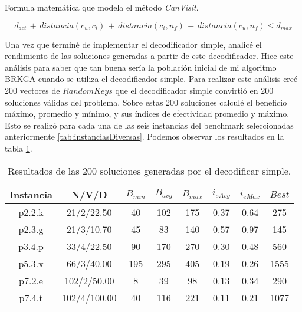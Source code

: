 \bigskip

\begin{mycapequ}[!ht]
	\caption{Formula matemática que modela el método \textit{CanVisit}.}
	\begin{equation} \label{eq:canVisit}
	d_{act}\, +\, distancia(c_u, c_i)\, +\, distancia(c_i, n_f)\, -\, distancia(c_u, n_f) \leq d_{max}
	\end{equation}
\end{mycapequ}

\bigskip

Una vez que terminé de implementar el decodificador simple, analicé el rendimiento de las soluciones generadas a partir de este decodificador. Hice este análisis para saber que tan buena sería la población inicial de mi algoritmo BRKGA cuando se utiliza el decodificador simple. Para realizar este análisis creé 200 vectores de $RandomKeys$ que el decodificador simple convirtió en 200 soluciones válidas del problema. Sobre estas 200 soluciones calculé el beneficio máximo, promedio y mínimo, y sus índices de efectividad promedio y máximo. Esto se realizó para cada una de las seis instancias del benchmark seleccionadas anteriormente \ref{tab:instanciasDiversas}. Podemos observar los resultados en la tabla \ref{tab:resultadosDecoSimple}.

\bigskip

\begin{table}
\begin{center}
\begin{tabular}{ |c|c|c|c|c|c|c|c| } 
\hline
Instancia & N/V/D & $B_{min}$ & $B_{avg}$ & $B_{max}$ & $i_{eAvg}$ & $i_{eMax}$ & $Best$ \\
\hline
p2.2.k & 21/2/22.50 & 40 & 102 & 175 & 0.37 & 0.64 & 275 \\
p2.3.g & 21/3/10.70 & 45 & 83 & 140 & 0.57 & 0.97 & 145 \\
p3.4.p & 33/4/22.50 & 90 & 170 & 270 & 0.30 & 0.48 & 560 \\
p5.3.x & 66/3/40.00 & 195 & 295 & 405 & 0.19 & 0.26 & 1555 \\
p7.2.e & 102/2/50.00 & 8 & 39 & 98 & 0.13 & 0.34 & 290 \\
p7.4.t & 102/4/100.00 & 40 & 116 & 221 & 0.11 & 0.21 & 1077 \\
\hline
\end{tabular}
\end{center}
\caption{Resultados de las 200 soluciones generadas por el decodificar simple.}
\label{tab:resultadosDecoSimple}
\end{table}

